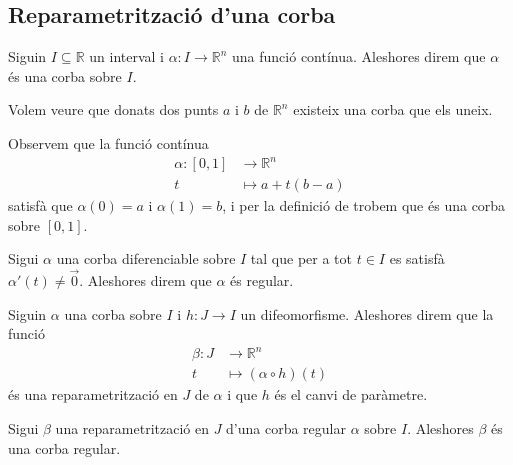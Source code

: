 \documentclass[../Apunts.tex]{subfiles}
\begin{document}
	\subsection{Reparametrització d'una corba}
	\begin{definition}[Corba]
		\label{def:corba}
		Siguin \(I\subseteq\mathbb{R}\) un interval i \(\alpha\colon I\longrightarrow\mathbb{R}^{n}\) una funció contínua. Aleshores direm que \(\alpha\) és una corba sobre \(I\).
	\end{definition}
	\begin{example}
		\label{ex:corba que uniex dos punts}
		Volem veure que donats dos punts \(a\) i \(b\) de \(\mathbb{R}^{n}\) existeix una corba que els uneix.
		\begin{solution}
			Observem que la funció contínua %
			\begin{align*}
				\alpha\colon[0,1]&\longrightarrow\mathbb{R}^{n} \\
				t&\longmapsto a+t(b-a)
			\end{align*}
			satisfà que \(\alpha(0)=a\) i \(\alpha(1)=b\), i per la definició de  trobem que és una corba sobre \([0,1]\).
		\end{solution}
	\end{example}
	\begin{definition}
		\label{def:corba regular}
		Sigui \(\alpha\) una corba diferenciable sobre \(I\) tal que per a tot \(t\in I\) es satisfà \(\alpha'(t)\neq\vec{0}\). Aleshores direm que \(\alpha\) és regular.
	\end{definition}
	\begin{definition}[Reparametrització]
		\label{def:reparametrització d'una corba}
		\label{def:canvi de paràmetre}
		Siguin \(\alpha\) una corba sobre \(I\) i \(h\colon J\longrightarrow I\) un difeomorfisme. Aleshores direm que la funció
		\begin{align*}
			\beta\colon J&\longrightarrow\mathbb{R}^{n} \\
			t&\longmapsto(\alpha\circ h)(t)
		\end{align*}
		és una reparametrització en \(J\) de \(\alpha\) i que \(h\) és el canvi de paràmetre.
	\end{definition}
	\begin{proposition}
		Sigui \(\beta\) una reparametrització en \(J\) d'una corba regular \(\alpha\) sobre \(I\). Aleshores \(\beta\) és una corba regular.
	\end{proposition}
\end{document}
